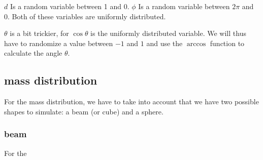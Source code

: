 $d$ Is a random variable between 1 and 0. $\phi$ Is a random variable between $2\pi$ and 0. Both of these variables are uniformly distributed.

$\theta$ is a bit trickier, for $\cos\theta$ is the uniformly distributed variable. We will thus have to randomize a value between $-1$ and $1$ and use the $\arccos$ function to  calculate the angle $\theta$.
\subsection{mass distribution}
For the mass distribution, we have to take into account that we have two possible shapes to simulate: a beam (or cube) and a sphere.
\subsubsection{beam}
For the 